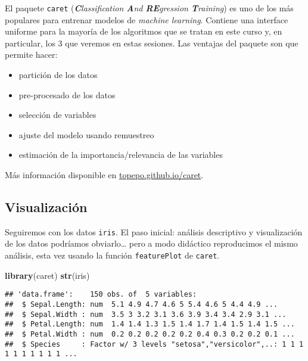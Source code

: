 \documentclass[]{book}
\newenvironment{Shaded}{\begin{snugshade}}{\end{snugshade}}
\newcommand{\KeywordTok}[1]{\textcolor[rgb]{0.13,0.29,0.53}{\textbf{#1}}}
\newcommand{\NormalTok}[1]{#1}
\providecommand{\tightlist}{%
  \setlength{\itemsep}{0pt}\setlength{\parskip}{0pt}}
\begin{document}
El paquete \texttt{caret} (\emph{\textbf{C}lassification \textbf{A}nd \textbf{RE}gression \textbf{T}raining}) es uno de los más populares para entrenar modelos de \emph{machine learning}. Contiene una interface uniforme para la mayoría de los algoritmos que se tratan en este curso y, en particular, los 3 que veremos en estas sesiones. Las ventajas del paquete son que permite hacer:

\begin{itemize}
\tightlist
\item
  partición de los datos
\item
  pre-procesado de los datos
\item
  selección de variables
\item
  ajuste del modelo usando remuestreo
\item
  estimación de la importancia/relevancia de las variables
\end{itemize}

Más información disponible en \href{http://topepo.github.io/caret/index.html}{topepo.github.io/caret}.

\hypertarget{visualizaciuxf3n}{%
\subsection{Visualización}\label{visualizaciuxf3n}}

Seguiremos con los datos \texttt{iris}. El paso inicial: análisis descriptivo y visualización de los datos podríamos obviarlo\ldots{} pero a modo didáctico reproducimos el mismo análisis, esta vez usando la función \texttt{featurePlot} de \texttt{caret}.

\begin{Shaded}
\begin{Highlighting}[]
\KeywordTok{library}\NormalTok{(caret)}
\KeywordTok{str}\NormalTok{(iris)}
\end{Highlighting}
\end{Shaded}

\begin{verbatim}
## 'data.frame':    150 obs. of  5 variables:
##  $ Sepal.Length: num  5.1 4.9 4.7 4.6 5 5.4 4.6 5 4.4 4.9 ...
##  $ Sepal.Width : num  3.5 3 3.2 3.1 3.6 3.9 3.4 3.4 2.9 3.1 ...
##  $ Petal.Length: num  1.4 1.4 1.3 1.5 1.4 1.7 1.4 1.5 1.4 1.5 ...
##  $ Petal.Width : num  0.2 0.2 0.2 0.2 0.2 0.4 0.3 0.2 0.2 0.1 ...
##  $ Species     : Factor w/ 3 levels "setosa","versicolor",..: 1 1 1 1 1 1 1 1 1 1 ...
\end{verbatim}
\end{document}
